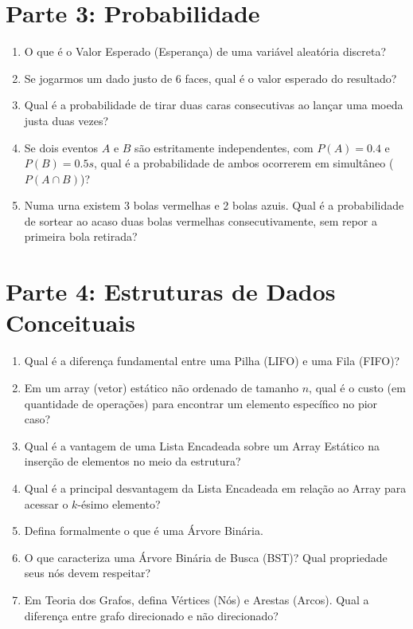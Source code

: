 \documentclass[10pt,a4paper]{article}
\begin{document}
\section*{Parte 3: Probabilidade}
\begin{enumerate}[leftmargin=*, itemsep=2pt, parsep=0pt, resume]
    \item O que é o Valor Esperado (Esperança) de uma variável aleatória discreta?
    \item Se jogarmos um dado justo de 6 faces, qual é o valor esperado do resultado?
    \item Qual é a probabilidade de tirar duas caras consecutivas ao lançar uma moeda justa duas vezes?
    \item Se dois eventos $A$ e $B$ são estritamente independentes, com $P(A) = 0.4$ e $P(B) = 0.5s$, qual é a probabilidade de ambos ocorrerem em simultâneo ($P(A \cap B)$)?
    \item Numa urna existem 3 bolas vermelhas e 2 bolas azuis. Qual é a probabilidade de sortear ao acaso duas bolas vermelhas consecutivamente, sem repor a primeira bola retirada?
\end{enumerate}

\section*{Parte 4: Estruturas de Dados Conceituais}
\begin{enumerate}[leftmargin=*, itemsep=2pt, parsep=0pt, resume]
    \item Qual é a diferença fundamental entre uma Pilha (LIFO) e uma Fila (FIFO)?
    \item Em um array (vetor) estático não ordenado de tamanho $n$, qual é o custo (em quantidade de operações) para encontrar um elemento específico no pior caso?
    \item Qual é a vantagem de uma Lista Encadeada sobre um Array Estático na inserção de elementos no meio da estrutura?
    \item Qual é a principal desvantagem da Lista Encadeada em relação ao Array para acessar o $k$-ésimo elemento?
    \item Defina formalmente o que é uma Árvore Binária.
    \item O que caracteriza uma Árvore Binária de Busca (BST)? Qual propriedade seus nós devem respeitar?
    \item Em Teoria dos Grafos, defina Vértices (Nós) e Arestas (Arcos). Qual a diferença entre grafo direcionado e não direcionado?
\end{enumerate}
\end{document}
